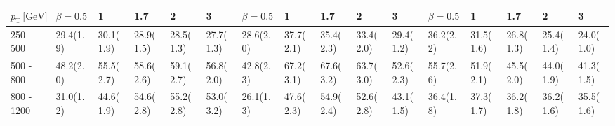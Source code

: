 \begin{table}
{\begin{tabular}{llllllllllllllll}
\multicolumn{1}{l||}{$p_{\mathrm{T}} \, \text{[GeV]}$}   &  \multicolumn{1}{l|}{ \cellcolor{Gray2} $\beta=0.5$} & \multicolumn{1}{l|}{\cellcolor{Gray2} 1} & \multicolumn{1}{l|}{\cellcolor{Gray2}1.7} &   \multicolumn{1}{l|}{\cellcolor{Gray2} 2} &  \multicolumn{1}{l||}{\cellcolor{Gray2} 3} & \multicolumn{1}{l|}{\cellcolor{Gray2} $\beta=0.5$} &  \multicolumn{1}{l|}{\cellcolor{Gray2} 1} & 	\multicolumn{1}{l|}{\cellcolor{Gray2} 1.7} & 	\multicolumn{1}{l|}{\cellcolor{Gray2} 2} & \multicolumn{1}{l||}{\cellcolor{Gray2} 3} & \multicolumn{1}{l|}{ \cellcolor{Gray2} $\beta=0.5$} & \multicolumn{1}{l|}{\cellcolor{Gray2} 1} & \multicolumn{1}{l|}{\cellcolor{Gray2} 1.7} &  \multicolumn{1}{l|}{\cellcolor{Gray2} 2} & \multicolumn{1}{l|}{\cellcolor{Gray2} 3} \\ \hline \hline
\multicolumn{1}{l||}{250 - 500} & 	\multicolumn{1}{l|}{29.4(1.9)} & \multicolumn{1}{l|}{30.1(1.9)} & \multicolumn{1}{l|}{28.9(1.5)} & 				     	\multicolumn{1}{l|}{28.5(1.3)} & 						\multicolumn{1}{l||}{27.7(1.3)} & \multicolumn{1}{l|}{28.6(2.0)} & \multicolumn{1}{l|}{\cellcolor{Red!50}37.7(2.1)} & 		\multicolumn{1}{l|}{35.4(2.3)} & 					\multicolumn{1}{l|}{33.4(2.0)} & 	\multicolumn{1}{l||}{29.4(1.2)} & 					\multicolumn{1}{l|}{36.2(2.2)} & 	\multicolumn{1}{l|}{31.5(1.6)} & \multicolumn{1}{l|}{26.8(1.3)} & \multicolumn{1}{l|}{25.4(1.4)} & \multicolumn{1}{l|}{24.0(1.0)} \\
\multicolumn{1}{l||}{500 - 800} & 	\multicolumn{1}{l|}{48.2(2.0)} & \multicolumn{1}{l|}{55.5(2.7)} & \multicolumn{1}{l|}{58.6(2.6)} & 				     	\multicolumn{1}{l|}{59.1(2.7)} & 						\multicolumn{1}{l||}{56.8(2.0)} & \multicolumn{1}{l|}{42.8(2.3)} & \multicolumn{1}{l|}{67.2(3.1)} & 						\multicolumn{1}{l|}{\cellcolor{Red!50}67.6(3.2)} & 	\multicolumn{1}{l|}{63.7(3.0)} & 	\multicolumn{1}{l||}{52.6(2.3)} & 					\multicolumn{1}{l|}{55.7(2.6)} & 	\multicolumn{1}{l|}{51.9(2.1)} & \multicolumn{1}{l|}{45.5(2.0)} & \multicolumn{1}{l|}{44.0(1.9)} & \multicolumn{1}{l|}{41.3(1.5)} \\
\multicolumn{1}{l||}{800 - 1200} & 	\multicolumn{1}{l|}{31.0(1.2)} & \multicolumn{1}{l|}{44.6(1.9)} & \multicolumn{1}{l|}{54.6(2.8)} & 				     	\multicolumn{1}{l|}{\cellcolor{Red!50}55.2(2.8)} & 		\multicolumn{1}{l||}{53.0(3.2)} & \multicolumn{1}{l|}{26.1(1.3)} & \multicolumn{1}{l|}{47.6(2.3)} & 						\multicolumn{1}{l|}{54.9(2.4)} & 					\multicolumn{1}{l|}{52.6(2.8)} & 	\multicolumn{1}{l||}{43.1(1.5)} & 					\multicolumn{1}{l|}{36.4(1.8)} & 	\multicolumn{1}{l|}{37.3(1.7)} & \multicolumn{1}{l|}{36.2(1.8)} & \multicolumn{1}{l|}{36.2(1.6)} & \multicolumn{1}{l|}{35.5(1.6)} \\

\end{tabular}}
\end{table}
